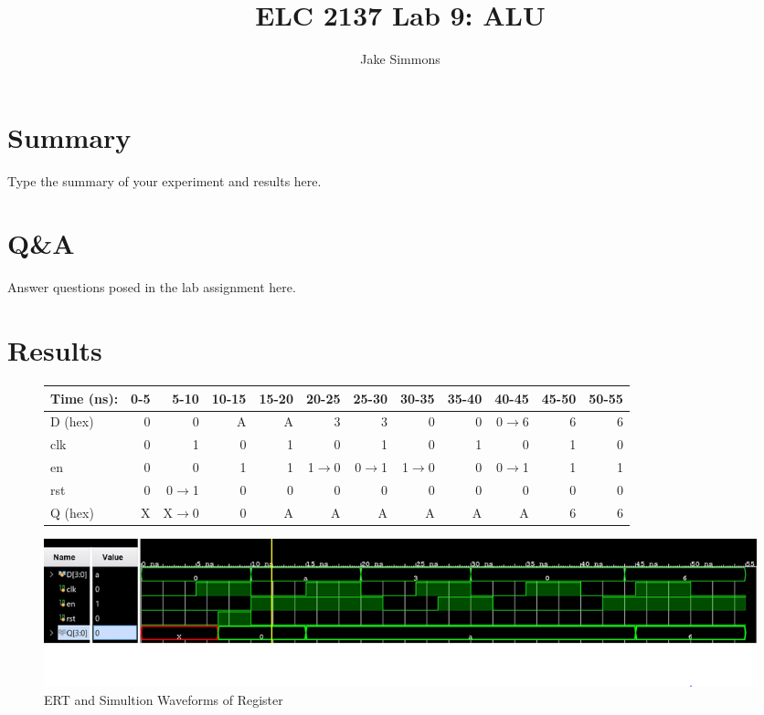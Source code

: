 \documentclass[11pt]{article}
\begin{document}
\title{ELC 2137 Lab 9: ALU}
\author{Jake Simmons}

\maketitle


\section*{Summary}

Type the summary of your experiment and results here.  


\section*{Q\&A}

Answer questions posed in the lab assignment here.


\section*{Results}

\begin{figure}[ht]\centering
	\begin{tabular}{l|rrrrrrrrrrr}
		Time (ns): & 0-5 & 5-10 & 10-15 & 15-20 & 20-25 & 25-30 & 30-35 & 35-40 & 40-45 & 45-50 & 50-55 \\
		\midrule
		D (hex) & 0 & 0 & A & A & 3 & 3 & 0 & 0 & 0$\rightarrow$6 & 6 & 6 \\
		clk & 0 & 1 & 0 & 1 & 0 & 1 & 0 & 1 & 0 & 1 & 0  \\
		en & 0 & 0 & 1 & 1 & 1$\rightarrow$0 & 0$\rightarrow$1 & 1$\rightarrow$0 & 0 & 0$\rightarrow$1 & 1 & 1 \\
		rst & 0 & 0$\rightarrow$1 & 0 & 0 & 0 & 0 & 0 & 0 & 0 & 0 & 0 \\
		\midrule 
		Q (hex) & X & X$\rightarrow$0 & 0 & A & A & A & A & A & A & 6 & 6 \\
		\bottomrule
	\end{tabular}\medskip
	
	\includegraphics{register_test.JPG}
	\caption{ERT and Simultion Waveforms of Register}
	\label{fig:sim_with_table}
\end{figure}
\end{document}
